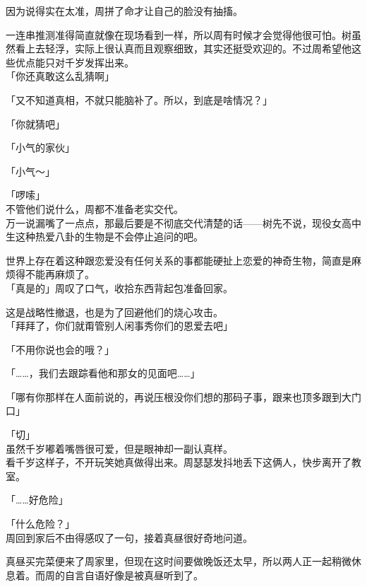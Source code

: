 因为说得实在太准，周拼了命才让自己的脸没有抽搐。

一连串推测准得简直就像在现场看到一样，所以周有时候才会觉得他很可怕。树虽然看上去轻浮，实际上很认真而且观察细致，其实还挺受欢迎的。不过周希望他这些优点能只对千岁发挥出来。\\

「你还真敢这么乱猜啊」

「又不知道真相，不就只能脑补了。所以，到底是啥情况？」

「你就猜吧」

「小气的家伙」

「小气～」

「啰嗦」\\

不管他们说什么，周都不准备老实交代。\\

万一说漏嘴了一点点，那最后要是不彻底交代清楚的话——树先不说，现役女高中生这种热爱八卦的生物是不会停止追问的吧。

世界上存在着这种跟恋爱没有任何关系的事都能硬扯上恋爱的神奇生物，简直是麻烦得不能再麻烦了。\\

「真是的」周叹了口气，收拾东西背起包准备回家。

这是战略性撤退，也是为了回避他们的烧心攻击。\\

「拜拜了，你们就甭管别人闲事秀你们的恩爱去吧」

「不用你说也会的哦？」

「……，我们去跟踪看他和那女的见面吧……」

「哪有你那样在人面前说的，再说压根没你们想的那码子事，跟来也顶多跟到大门口」

「切」\\

虽然千岁嘟着嘴唇很可爱，但是眼神却一副认真样。\\

看千岁这样子，不开玩笑她真做得出来。周瑟瑟发抖地丢下这俩人，快步离开了教室。\\

\vspace{2\baselineskip}

「……好危险」

「什么危险？」\\

周回到家后不由得感叹了一句，接着真昼很好奇地问道。

真昼买完菜便来了周家里，但现在这时间要做晚饭还太早，所以两人正一起稍微休息着。而周的自言自语好像是被真昼听到了。\\

